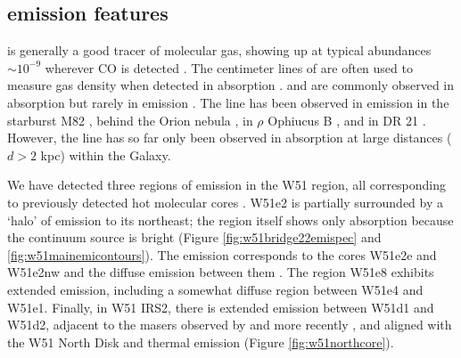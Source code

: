 

\subsection{\formaldehyde emission features}
\label{sec:h2coemission}

\formaldehyde is generally a good tracer of molecular gas, showing up at typical
abundances $\sim10^{-9}$ \hh wherever CO is detected \citep[e.g.,][]{Mangum1993a}.
The centimeter lines of \ortho are often used to measure gas density when
detected in absorption \citep[e.g.,][]{Ginsburg2011a,Zeiger2010a}.
\ortho \oneone and \twotwo are commonly observed in absorption
but rarely in emission \citep[e.g.,][]{Mangum1993a,Araya2007b}.  The \twotwo
line has been observed in emission in the starburst M82 \citep{Mangum2008a},
behind the Orion nebula
\citep{Evans1975a,Kutner1976a,Batrla1983a,Johnston1983a,Bastien1985a,Wilson1989a},
in $\rho$ Ophiucus B
\citep{Loren1980a,Loren1983a,Martin-Pintado1983a,Wadiak1985a}, and in DR 21
\citep{Wilson1982a,Johnston1984a}.  However, the \twotwo line has so far only
been observed in absorption at large distances ($d>2$ kpc) within the Galaxy.

We have detected three regions of \twotwo emission in the W51 region, all
corresponding to previously detected hot molecular cores
\citep{Zhang1997a,Shi2010a,Shi2010b,Goddi2015a,Goddi2016a}.   W51e2 is partially
surrounded by a `halo' of \formaldehyde \twotwo emission to its northeast; the
\hchii region itself shows only \twotwo
absorption because the continuum source is bright
(Figure \ref{fig:w51bridge22emispec} and \ref{fig:w51mainemicontours}).
The \formaldehyde emission corresponds to the cores W51e2e and W51e2nw and the diffuse
emission between them \citep{Goddi2016a,Shi2010a}.
The \hchii region W51e8 exhibits extended \twotwo emission, including a
somewhat diffuse region between W51e4 and W51e1.  Finally, in W51
IRS2, there is extended \twotwo
emission between W51d1 and W51d2, adjacent to the \ammonia masers
observed by \citet{Zhang1995a} and more recently \citet{Goddi2015a}, and
aligned with the \citet{Zapata2010a} W51 North Disk and thermal \ammonia emission (Figure
\ref{fig:w51northcore}).

